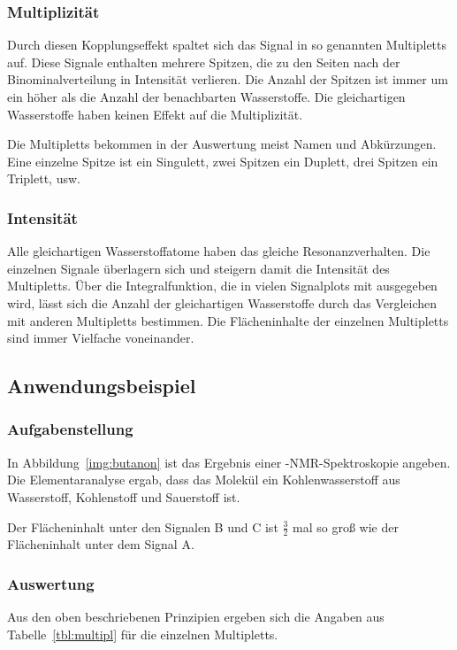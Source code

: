 \subsubsection*{Multiplizität}
Durch diesen Kopplungseffekt spaltet sich das Signal in so genannten Multipletts auf. Diese Signale enthalten mehrere Spitzen, die zu den Seiten nach der Binominalverteilung in Intensität verlieren. Die Anzahl der Spitzen ist immer um ein höher als die Anzahl der benachbarten Wasserstoffe. Die gleichartigen Wasserstoffe haben keinen Effekt auf die Multiplizität.

Die Multipletts bekommen in der Auswertung meist Namen und Abkürzungen. Eine einzelne Spitze ist ein Singulett, zwei Spitzen ein Duplett, drei Spitzen ein Triplett, usw.

\subsubsection*{Intensität}
Alle gleichartigen Wasserstoffatome haben das gleiche Resonanzverhalten. Die einzelnen Signale überlagern sich und steigern damit die Intensität des Multipletts. Über die Integralfunktion, die in vielen Signalplots mit ausgegeben wird, lässt sich die Anzahl der gleichartigen Wasserstoffe durch das Vergleichen mit anderen Multipletts bestimmen. Die Flächeninhalte der einzelnen Multipletts sind immer Vielfache voneinander.

\subsection{Anwendungsbeispiel}

\subsubsection*{Aufgabenstellung}
In Abbildung~\ref{img:butanon} ist das Ergebnis einer -NMR-Spektroskopie angeben. Die Elementaranalyse ergab, dass das Molekül ein Kohlenwasserstoff aus Wasserstoff, Kohlenstoff und Sauerstoff ist.

Der Flächeninhalt unter den Signalen B und C ist $\frac{3}{2}$ mal so gro\ss{} wie der Flächeninhalt unter dem Signal A.

\subsubsection*{Auswertung}
Aus den oben beschriebenen Prinzipien ergeben sich die Angaben aus Tabelle~\ref{tbl:multipl} für die einzelnen Multipletts.


